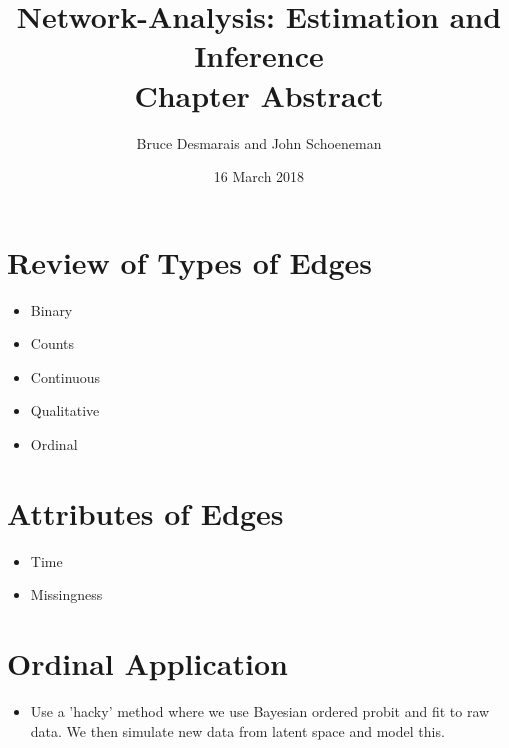 \documentclass[a4paper]{article}
\title{Network-Analysis: Estimation and Inference\\
\large Chapter Abstract}
\date{16 March 2018}
\author{Bruce Desmarais and John Schoeneman}
\begin{document}
\maketitle



\section{Review of Types of Edges}
\begin{itemize}
  \item {Binary}
  \item {Counts}
  \item {Continuous}
  \item {Qualitative}
  \item {Ordinal}
\end{itemize}

\section{Attributes of Edges}
\begin{itemize}
  \item {Time}
  \item {Missingness}
\end{itemize}

\section{Ordinal Application}
\begin{itemize}
  \item {Use a 'hacky' method where we use Bayesian ordered probit and fit to raw data. We then simulate new data from latent space and model this.}
\end{itemize}
\end{document}
